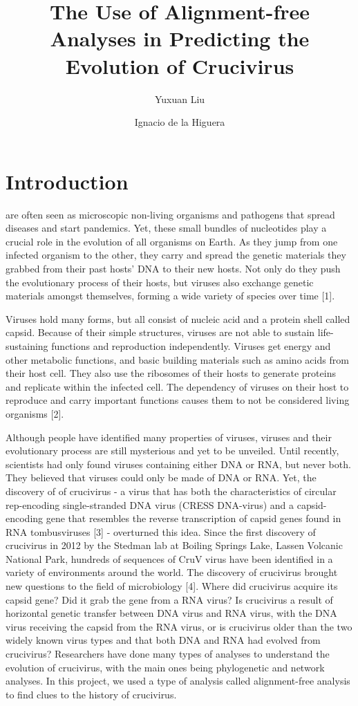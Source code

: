 \documentclass[eng]{ajceam-class}
\title{The Use of Alignment-free Analyses in Predicting the Evolution of Crucivirus}
\author[1]{Yuxuan Liu}
\author[2]{Ignacio de la Higuera}
\affil[1]{Institute of Computing in Research}
\begin{document}
\maketitle
\thispagestyle{fancy}
\printcontactdata

\section{Introduction}
are often seen as microscopic non-living organisms and pathogens that spread diseases and start pandemics. Yet, these small bundles of nucleotides play a crucial role in the evolution of all organisms on Earth. As they jump from one infected organism to the other, they carry and spread the genetic materials they grabbed from their past hosts’ DNA to their new hosts. Not only do they push the evolutionary process of their hosts, but viruses also exchange genetic materials amongst themselves, forming a wide variety of species over time [1]. 

Viruses hold many forms, but all consist of nucleic acid and a protein shell called capsid. Because of their simple structures, viruses are not able to sustain life-sustaining functions and reproduction independently. Viruses get energy and other metabolic functions, and basic building materials such as amino acids from their host cell. They also use the ribosomes of their hosts to generate proteins and replicate within the infected cell. The dependency of viruses on their host to reproduce and carry important functions causes them to not be considered living organisms [2].

Although people have identified many properties of viruses, viruses and their evolutionary process are still mysterious and yet to be unveiled. Until recently, scientists had only found viruses containing either DNA or RNA, but never both. They believed that viruses could only be made of DNA or RNA. Yet, the discovery of of crucivirus - a virus that has both the characteristics of circular rep-encoding single-stranded DNA virus (CRESS DNA-virus) and a capsid-encoding gene that resembles the reverse transcription of capsid genes found in RNA tombusviruses [3] - overturned this idea. Since the first discovery of crucivirus in 2012 by the Stedman lab at Boiling Springs Lake, Lassen Volcanic National Park, hundreds of sequences of CruV virus have been identified in a variety of environments around the world. The discovery of crucivirus brought new questions to the field of microbiology [4]. Where did crucivirus acquire its capsid gene? Did it grab the gene from a RNA virus? Is crucivirus a result of horizontal genetic transfer between DNA virus and RNA virus, with the DNA virus receiving the capsid from the RNA virus, or is crucivirus older than the two widely known virus types and that both DNA and RNA had evolved from crucivirus? Researchers have done many types of analyses to understand the evolution of crucivirus, with the main ones being phylogenetic and network analyses. In this project, we used a type of analysis called alignment-free analysis to find clues to the history of crucivirus. 
\end{document}
